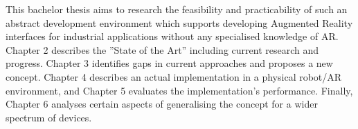 This bachelor thesis aims to research the feasibility and practicability of such an abstract development environment which supports developing Augmented Reality interfaces for industrial applications without any specialised knowledge of AR. Chapter 2 describes the ”State of the Art” including current research and progress. Chapter 3 identifies gaps in current approaches and proposes a new concept. Chapter 4 describes an actual implementation in a physical robot/AR environment, and Chapter 5 evaluates the implementation’s performance.  Finally, Chapter 6 analyses certain aspects of generalising the concept for a wider spectrum of devices.


























